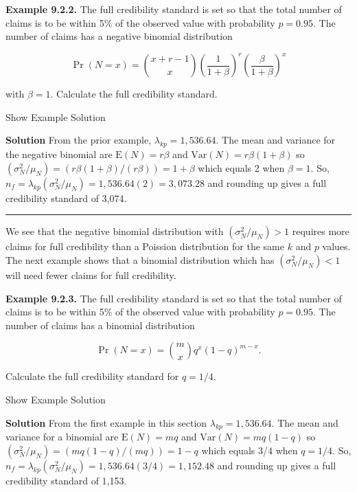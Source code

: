 \documentclass[]{book}
\theoremstyle{definition}
\theoremstyle{definition}
\theoremstyle{definition}
\theoremstyle{remark}
\begin{document}
\textbf{Example 9.2.2.} The full credibility standard is set so that the
total number of claims is to be within 5\(\%\) of the observed value
with probability \(p=0.95\). The number of claims has a negative
binomial distribution

\begin{equation*}
\Pr(N=x)={x+r-1\choose x} \left(\frac{1}{1+\beta}\right)^r \left(\frac{\beta}{1+\beta}\right)^x
\end{equation*}

with \(\beta=1\). Calculate the full credibility standard.

Show Example Solution

\hypertarget{toggleExampleCred.2.2}{}
\textbf{Solution} From the prior example, \(\lambda_{kp} =1,536.64\).
The mean and variance for the negative binomial are
\(\mathrm{E}(N)=r\beta\) and \(\mathrm{Var}(N)=r\beta(1+\beta)\) so
\((\sigma_N^2/\mu_N)=(r\beta(1+\beta)/(r\beta))=1+\beta\) which equals 2
when \(\beta=1\). So,
\(n_f=\lambda_{kp}(\sigma_N^2/\mu_N)=1,536.64(2)=3,073.28\) and rounding
up gives a full credibility standard of 3,074.

\begin{center}\rule{0.5\linewidth}{\linethickness}\end{center}

We see that the negative binomial distribution with
\((\sigma_N^2/\mu_N)>1\) requires more claims for full credibility than
a Poission distribution for the same \(k\) and \(p\) values. The next
example shows that a binomial distribution which has
\((\sigma_N^2/\mu_N)<1\) will need fewer claims for full credibility.

\textbf{Example 9.2.3.} The full credibility standard is set so that the
total number of claims is to be within 5\(\%\) of the observed value
with probability \(p=0.95\). The number of claims has a binomial
distribution

\begin{equation*}
\Pr(N=x)={m\choose x}q^x(1-q)^{m-x}.
\end{equation*}

Calculate the full credibility standard for \(q=1/4\).

Show Example Solution

\hypertarget{toggleExampleCred.2.3}{}
\textbf{Solution} From the first example in this section
\(\lambda_{kp} =1,536.64\). The mean and variance for a binomial are
\(\mathrm{E}(N)=mq\) and \(\mathrm{Var}(N)=mq(1-q)\) so
\((\sigma_N^2/\mu_N)=(mq(1-q)/(mq))=1-q\) which equals 3/4 when
\(q=1/4\). So,
\(n_f=\lambda_{kp}(\sigma_N^2/\mu_N)=1,536.64(3/4)=1,152.48\) and
rounding up gives a full credibility standard of 1,153.
\end{document}
